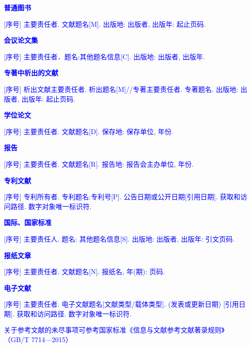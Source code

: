 \begin{bibprint}
\printbibliography [type=article,heading=none]

\textcolor{blue}{\textbf{普通图书}}

\noindent\textcolor{blue}{[序号] 主要责任者. 文献题名[M]. 出版地: 出版者, 出版年: 起止页码. }
\cite{张伯伟2002全唐五代诗格会考, OBRIEN1994Aircraft}

\printbibliography [keyword={book},heading=none]

\textcolor{blue}{\textbf{会议论文集}}

\noindent\textcolor{blue}{[序号] 主要责任者．题名:其他题名信息[C]. 出版地: 出版者, 出版年. }
\cite{雷光春2012}

\printbibliography [type=proceedings,heading=none]

\textcolor{blue}{\textbf{专著中析出的文献}}

\noindent\textcolor{blue}{[序号] 析出文献主要责任者. 析出题名[M]//专著主要责任者. 专著题名. 出版地: 出版者, 出版年: 起止页码. }
\cite{白书农}

\printbibliography [type=inbook,heading=none]

\textcolor{blue}{\textbf{学位论文}}

\noindent\textcolor{blue}{[序号] 主要责任者. 文献题名[D]. 保存地: 保存单位, 年份. }
\cite{zhanghesheng, Sobieski}

\printbibliography [keyword={thesis},heading=none]

\textcolor{blue}{\textbf{报告}}

\noindent\textcolor{blue}{[序号] 主要责任者. 文献题名[R]. 报告地: 报告会主办单位, 年份. }
\cite{fengxiqiao, Sobieszczanski}

\printbibliography [keyword={techreport},heading=none]

\textcolor{blue}{\textbf{专利文献}}

\noindent\textcolor{blue}{[序号] 专利所有者. 专利题名:专利号[P]. 公告日期或公开日期[引用日期]. 获取和访问路径. 数字对象唯一标识符.}
\cite{jiangxizhou}

\printbibliography [type=patent,heading=none]

\textcolor{blue}{\textbf{国际、国家标准}}

\noindent\textcolor{blue}{[序号] 主要责任人. 题名: 其他题名信息[S]. 出版地: 出版者, 出版年: 引文页码.}
\cite{GB/T3792.4-2009}

\printbibliography [keyword={standard},heading=none]

\textcolor{blue}{\textbf{报纸文章}}

\noindent\textcolor{blue}{[序号] 主要责任者. 文献题名[N]. 报纸名, 年(期): 页码. }
\cite{xiexide}

\printbibliography [keyword={newspaper},heading=none]

\textcolor{blue}{\textbf{电子文献}}

\noindent\textcolor{blue}{[序号] 主要责任者. 电子文献题名[文献类型/载体类型]. (发表或更新日期) [引用日期]. 获取和访问路径. 数字对象唯一标识符. }
\cite{yaoboyuan}

\printbibliography [keyword={online},heading=none]

\textcolor{blue}{关于参考文献的未尽事项可参考国家标准《信息与文献参考文献著录规则》（GB/T 7714—2015）}

\end{bibprint}

